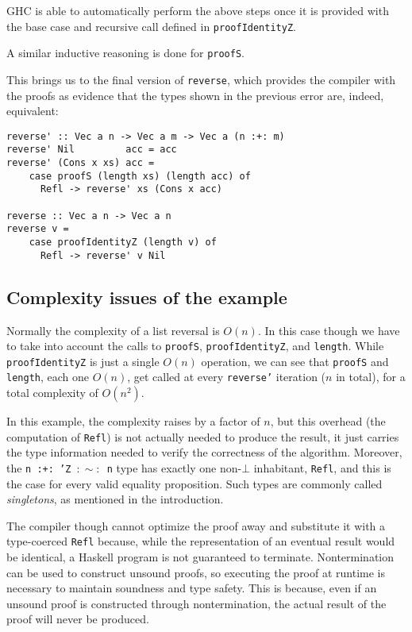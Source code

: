 GHC is able to automatically perform the above steps once it is provided with the base case and recursive call defined in \texttt{proofIdentityZ}.

A similar inductive reasoning is done for \texttt{proofS}.

This brings us to the final version of \texttt{reverse}, which provides the compiler with the proofs as evidence that the types shown in the previous error are, indeed, equivalent:

\begin{lstlisting}[label=lst:reversal-final,caption=Length-indexed vector reversal]
reverse' :: Vec a n -> Vec a m -> Vec a (n :+: m)
reverse' Nil         acc = acc
reverse' (Cons x xs) acc =
    case proofS (length xs) (length acc) of
      Refl -> reverse' xs (Cons x acc)

reverse :: Vec a n -> Vec a n
reverse v =
    case proofIdentityZ (length v) of
      Refl -> reverse' v Nil
\end{lstlisting}

\subsection{Complexity issues of the example}
\label{subsec:complexity-issues}

Normally the complexity of a list reversal is $O(n)$.
In this case though we have to take into account the calls to \texttt{proofS}, \texttt{proofIdentityZ}, and \texttt{length}.
While \texttt{proofIdentityZ} is just a single $O(n)$ operation, we can see that \texttt{proofS} and \texttt{length}, each one $O(n)$, get called at every \texttt{reverse'} iteration ($n$ in total), for a total complexity of $O(n^2)$.

In this example, the complexity raises by a factor of $n$, but this overhead (the computation of \texttt{Refl}) is not actually needed to produce the result, it just carries the type information needed to verify the correctness of the algorithm.
Moreover, the \texttt{n :+: 'Z $:\sim:$ n} type has exactly one non-$\bot$ inhabitant, \texttt{Refl}, and this is the case for every valid equality proposition. Such types are commonly called \emph{singletons}, as mentioned in the introduction.

The compiler though cannot optimize the proof away and substitute it with a type-coerced \texttt{Refl} because, while the representation of an eventual result would be identical, a Haskell program is not guaranteed to terminate. Nontermination can be used to construct unsound proofs, so executing the proof at runtime is necessary to maintain soundness and type safety.
This is because, even if an unsound proof is constructed through nontermination, the actual result of the proof will never be produced.

